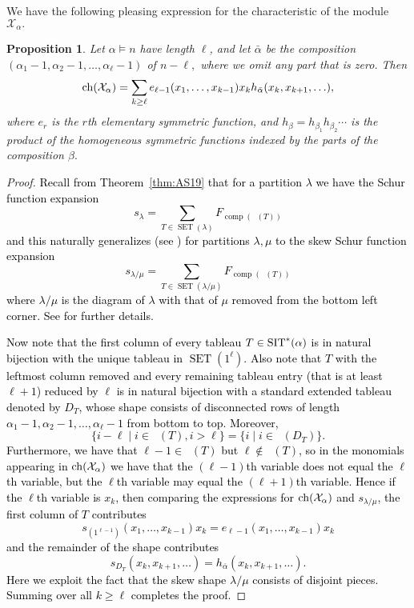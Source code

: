\documentclass[12pt,letterpaper]{amsart}
\newcommand{\svwtwo}{\textcolor{black}}
\newtheorem{proposition}[theorem]{Proposition}
\theoremstyle{definition}
\DeclareMathOperator{\comp}{comp}
\newcommand{\dI}{\mathfrak{S}^*}
\DeclareMathOperator{\DesI}{Des_{\dI}}
\newcommand{\SET}{\ensuremath{\operatorname{SET}}} \newcommand{\NSET}{\ensuremath{\operatorname{NSET}}}\newcommand{\SRCT}{\ensuremath{\operatorname{SRCT}}}
\newcommand{\suchthat}{\;|\;}
\begin{document}
We have the following pleasing expression for the characteristic  of the module $\mathcal{X}_\alpha.$  
\begin{proposition}\label{prop:ElizabethSIT*-char} Let $\alpha\vDash n$ have length $\ell$, and let $\bar\alpha$ be the composition $(\alpha_1-1, \alpha_2-1, \ldots, \alpha_\ell-1)$ of $n-\ell,$ where we omit any part that is zero.  Then \[\operatorname{\mathrm{ch}}(\mathcal{X}_\alpha)= 
\sum_{k\ge \ell} e_{\ell-1}(x_1,\ldots,x_{k-1}) x_k h_{\bar{\alpha}}(x_k,x_{k+1},\ldots ) ,\]
where $e_r$ is the $r$th elementary symmetric function, and $h_\beta=h_{\beta_1}h_{\beta_2}\cdots $ is the product of the homogeneous symmetric functions indexed by the parts of the composition $\beta.$
\end{proposition}

\begin{proof} 
\svwtwo{Recall from Theorem~\ref{thm:AS19} that for a partition $\lambda$ we have the Schur function expansion 
$$s_\lambda = \sum _{T\in \SET (\lambda)} F_{\comp (\DesI (T))}$$and this naturally generalizes (see \cite[Theorem~7.19.7]{RPSEC21999}) for partitions $\lambda, \mu$  to the skew Schur function expansion 
$$s_{\lambda/\mu} = \sum _{T\in \SET (\lambda/\mu)} F_{\comp (\DesI (T))}$$where $\lambda/\mu$ is the diagram of $\lambda$ with that of $\mu$ removed from the bottom left corner. See \cite{gessel} for further details.}

\svwtwo{Now note that the first column of every tableau $T\in \operatorname{SIT} ^* (\alpha)$ is in natural bijection with the unique tableau in $\SET(1^\ell)$.
 Also note that $T$ with the leftmost column removed and every remaining tableau entry (that is at least $\ell +1$) reduced by $\ell$ is in natural bijection with a standard extended tableau denoted by $D_T$,  whose shape consists of disconnected rows of length $\alpha _1 -1, \alpha _2 -1, \ldots , \alpha _\ell -1$ from bottom to top. Moreover, 
$$\{ i-\ell \suchthat i\in \DesI (T), i>\ell \} = \{ i \suchthat i\in \DesI (D_T) \}.$$ Furthermore, we have that $\ell -1 \in \DesI (T)$ but $\ell \not \in \DesI (T)$, so in the monomials appearing in $\operatorname{\mathrm{ch}}(\mathcal{X}_\alpha)$ we have that the $(\ell-1)$th variable does not equal the $\ell$th variable, but the $\ell$th variable may equal the $(\ell+1)$th variable. Hence if the $\ell$th variable is $x_k$, then comparing the expressions for $\operatorname{\mathrm{ch}}(\mathcal{X}_\alpha)$ and $s_{\lambda /\mu}$, the first column of $T$ contributes
$$s_{(1^{\ell -1})}(x_1,\ldots,x_{k-1})x_k=e_{\ell-1}(x_1,\ldots,x_{k-1}) x_k$$and the remainder of the shape contributes
$$s_{D_T}(x_k,x_{k+1},\ldots )= h_{\bar{\alpha}}(x_k,x_{k+1},\ldots ).$$ Here we exploit the fact that the skew shape $\lambda/\mu$ consists of disjoint pieces. Summing over all $k\geq \ell$ completes the proof.}
\end{proof}
\end{document}
